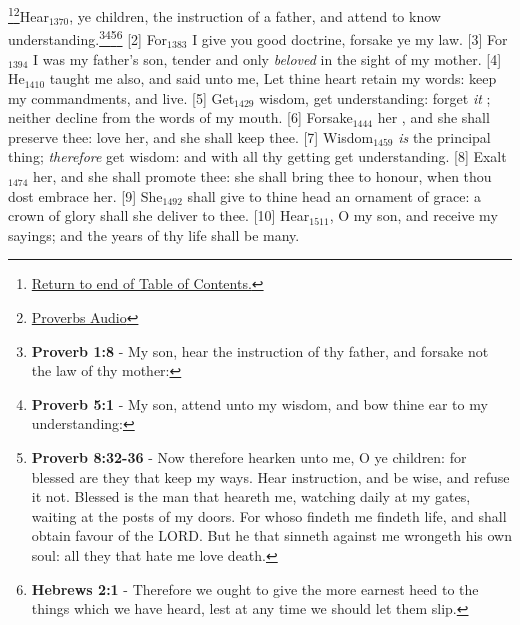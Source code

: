 \footnote{\textcolor[cmyk]{0.99998,1,0,0}{\hyperlink{TOC}{Return to end of Table of Contents.}}}\footnote{\href{https://audiobible.com/bible/bible.html}{\textcolor[cmyk]{0.99998,1,0,0}{Proverbs Audio}}}\textcolor[cmyk]{0.99998,1,0,0}{Hear\textcolor{jungle}{$_{1370}$}, ye children, the instruction of a father, and attend to know understanding.}\footnote{\textbf{Proverb 1:8} - My son, hear the instruction of thy father, and forsake not the law of thy mother:}\footnote{\textbf{Proverb 5:1} - My son, attend unto my wisdom, and bow thine ear to my understanding:}\footnote{\textbf{Proverb 8:32-36} - Now therefore hearken unto me, O ye children: for blessed are they that keep my ways. Hear instruction, and be wise, and refuse it not. Blessed is the man that heareth me, watching daily at my gates, waiting at the posts of my doors. For whoso findeth me findeth life, and shall obtain favour of the LORD. But he that sinneth against me wrongeth his own soul: all they that hate me love death.}\footnote{\textbf{Hebrews 2:1} - Therefore we ought to give the more earnest heed to the things which we have heard, lest at any time we should let them slip.}
[2] \textcolor[cmyk]{0.99998,1,0,0}{For\textcolor{jungle}{$_{1383}$} I give you good doctrine, forsake ye  my law.}
[3] \textcolor[cmyk]{0.99998,1,0,0}{For\textcolor{jungle}{$_{1394}$} I was my father's son, tender and only \emph{beloved} in the sight of my mother.}
[4] \textcolor[cmyk]{0.99998,1,0,0}{He\textcolor{jungle}{$_{1410}$} taught me also, and said unto me, Let thine heart retain my words: keep my commandments, and live.}
[5] \textcolor[cmyk]{0.99998,1,0,0}{Get\textcolor{jungle}{$_{1429}$} wisdom, get understanding: forget \emph{it} ; neither decline from the words of my mouth.}
[6] \textcolor[cmyk]{0.99998,1,0,0}{Forsake\textcolor{jungle}{$_{1444}$} her , and she shall preserve thee: love her, and she shall keep thee.}
[7] \textcolor[cmyk]{0.99998,1,0,0}{Wisdom\textcolor{jungle}{$_{1459}$} \emph{is} the principal thing; \emph{therefore} get wisdom: and with all thy getting get understanding.}
[8] \textcolor[cmyk]{0.99998,1,0,0}{Exalt\textcolor{jungle}{$_{1474}$} her, and she shall promote thee: she shall bring thee to honour, when thou dost embrace her.}
[9] \textcolor[cmyk]{0.99998,1,0,0}{She\textcolor{jungle}{$_{1492}$} shall give to thine head an ornament of grace: a crown of glory shall she deliver to thee.}
[10] \textcolor[cmyk]{0.99998,1,0,0}{Hear\textcolor{jungle}{$_{1511}$}, O my son, and receive my sayings; and the years of thy life shall be many.}
